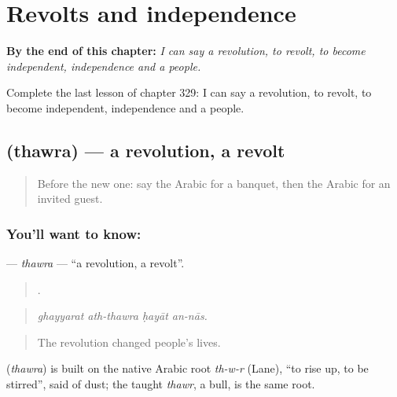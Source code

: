 
\chapter{Revolts and independence}
\label{ch:ar-revolts-and-independence}

\begin{chapteropening}
\textbf{By the end of this chapter:} \emph{I can say a revolution, to revolt, to become independent, independence and a people.}

Complete the last lesson of chapter 329: I can say a revolution, to revolt, to become independent, independence and a people.
\end{chapteropening}

\section[\texorpdfstring{\ar{ثورة} (thawra)}{ثورة (thawra)}]{ (thawra) — a revolution, a revolt}

\label{lesson:AR-C329-thawra}



\begin{quote}
Before the new one: say the Arabic for a banquet, then the Arabic for an invited guest.
\end{quote}

\subsection*{You'll want to know: }
\textbf{} — \emph{thawra} — \textquotedblleft{}a revolution, a revolt\textquotedblright{}.

\begin{quote}
   .
\end{quote}

\begin{quote}
\emph{ghayyarat ath-thawra ḥayāt an-nās.}
\end{quote}

\begin{quote}
The revolution changed people’s lives.
\end{quote}

\begin{cousinweb}
\textbf{} (\emph{thawra}) is built on the native Arabic root \emph{th-w-r} (Lane), \textquotedblleft{}to rise up, to be stirred\textquotedblright{}, said of dust; the taught \emph{thawr}, a bull, is the same root.
\end{cousinweb}

